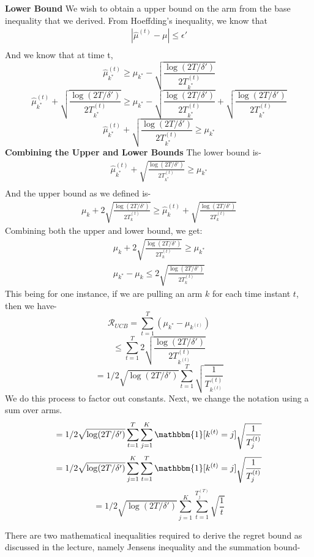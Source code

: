 \documentclass[11pt]{article}
\begin{document}
\textbf{Lower Bound} We wish to obtain a upper bound on the arm from the base inequality that we derived. From Hoeffding's inequality, we know that 
\begin{align*}
    |\hat{\mu}^{(t)} - \mu | \le \epsilon' \\
\end{align*}
And we know that at time t,
$$\hat{\mu}_{k^*}^{(t)} \ge \mu_{k^*} - \sqrt{\frac{\log(2T/\delta')}{2T_{k^*}^{(t)}}}$$
$$\hat{\mu}_{k^*}^{(t)} + \sqrt{\frac{\log(2T/\delta')}{2T_{k^*}^{(t)}}} \ge \mu_{k^*} - \sqrt{\frac{\log(2T/\delta')}{2T_{k^*}^{(t)}}} + \sqrt{\frac{\log(2T/\delta')}{2T_{k^*}^{(t)}}}$$
$$\hat{\mu}_{k^*}^{(t)} + \sqrt{\frac{\log(2T/\delta')}{2T_{k^*}^{(t)}}} \ge \mu_{k^*}$$
\textbf{Combining the Upper and Lower Bounds} 
The lower bound is-
\begin{align*}
   \hat{\mu}_{k^*}^{(t)} + \sqrt{\frac{\log(2T/\delta')}{2T_{k^*}^{(t)}}} \ge \mu_{k^*}\\
\end{align*}
And the upper bound as we defined is-
\begin{align*}
    \mu_k + 2\sqrt{\frac{\log(2T/\delta')}{2T_{k}^{(t)}}} \ge \hat{\mu}_k^{(t)} + \sqrt{\frac{\log(2T/\delta')}{2T_{k}^{(t)}}}
\end{align*}
Combining both the upper and lower bound, we get:
\begin{align*}
    \mu_k + 2\sqrt{\frac{\log(2T/\delta')}{2T_{k}^{(t)}}} \ge \mu_{k^*} \\
    \mu_{k^*} -  \mu_k \leq 2\sqrt{\frac{\log(2T/\delta')}{2T_{k}^{(t)}}}
\end{align*}
This being for one instance, if we are pulling an arm $k$ for each time instant $t$, then we have-
$$\mathcal{R}_{UCB} = \sum_{t=1}^T (\mu_{k^*} - \mu_{k^{(t)}})$$
$$ \leq \sum_{t=1}^T 2\sqrt{\frac{\log(2T/\delta')}{2T_{k^{(t)}}^{(t)}}}$$
$$ = 1/2\sqrt{\log(2T/\delta')} \sum_{t=1}^T 
\sqrt{\frac{1}{T_{k^{(t)}}^{(t)}}}$$
We do this process to factor out constants. Next, we change the notation using a sum over arms.
$$ = 1/2\sqrt{\log(2T/\delta')} \sum_{t=1}^T \sum_{j=1}^K \mathbbm{1}[k^{(t)} = j]\sqrt{\frac{1}{T_{j}^{(t)}}}$$
$$ = 1/2\sqrt{\log(2T/\delta')} \sum_{j=1}^K \sum_{t=1}^T \mathbbm{1}[k^{(t)} = j]\sqrt{\frac{1}{T_{j}^{(t)}}}$$
$$ = 1/2\sqrt{\log(2T/\delta')} \sum_{j=1}^K \sum_{t=1}^{T_j^{(T)}} \sqrt{\frac{1}{t}}$$

There are two mathematical inequalities required to derive the regret bound as discussed in the lecture, namely Jensens inequality and the summation bound-
\end{document}
